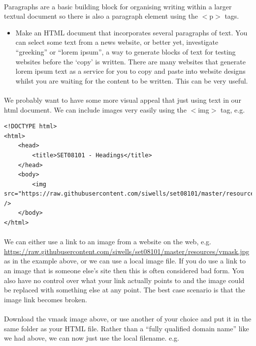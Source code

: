 \documentclass[10pt, a4paper, twosize]{article}
\begin{document}
\paragraph{} Paragraphs are a basic building block for organising writing within a larger textual document so there is also a paragraph element using the $<$p$>$ tags.

\begin{itemize}
\item Make an HTML document that incorporates several paragraphs of text. You can select some text from a news website, or better yet, investigate ``greeking'' or ``lorem ipsum'', a way to generate blocks of text for testing websites before the `copy' is written. There are many websites that generate lorem ipsum text as a service for you to copy and paste into website designs whilst you are waiting for the content to be written. This can be very useful.
\end{itemize}

\paragraph{} We probably want to have some more visual appeal that just using text in our html document. We can include images very easily using the $<$img$>$ tag, e.g.

\begin{lstlisting}
<!DOCTYPE html>
<html>
    <head>
        <title>SET08101 - Headings</title>
    </head>
    <body>
        <img src="https://raw.githubusercontent.com/siwells/set08101/master/resources/vmask.jpg" />      
    </body>
</html>
\end{lstlisting}

\paragraph{} We can either use a link to an image from a website on the web, e.g. \url{https://raw.githubusercontent.com/siwells/set08101/master/resources/vmask.jpg} as in the example above, or we can use a local image file. If you do use a link to an image that is someone else's site then this is often considered bad form. You also have no control over what your link actually points to and the image could be replaced with something else at any point. The best case scenario is that the image link becomes broken. 

\paragraph{} Download the vmask image above, or use another of your choice and put it in the same folder as your HTML file. Rather than a ``fully qualified domain name'' like we had above, we can now just use the local filename. e.g.
\end{document}
